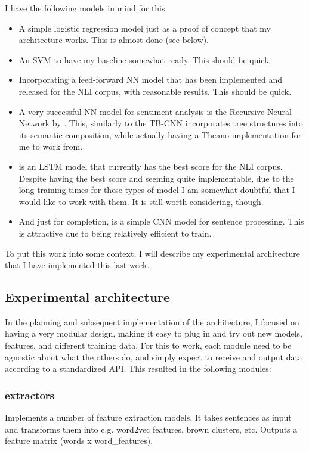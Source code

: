 I have the following models in mind for this:

\begin{itemize}
	\item A simple logistic regression model just as a proof of concept that my architecture works. This is almost done (see below).
	\item An SVM to have my baseline somewhat ready. This should be quick.
	\item Incorporating a feed-forward NN model that has been implemented and released for the NLI corpus, with reasonable results. This should be quick.
	\item A very successful NN model for sentiment analysis is the Recursive Neural Network by \cite{socher2013recursive}. This, similarly to the TB-CNN incorporates tree structures into its semantic composition, while actually having a Theano implementation for me to work from.
	\item \cite{cheng_long_2016} is an LSTM model that currently has the best score for the NLI corpus. Despite having the best score and seeming quite implementable, due to the long training times for these types of model I am somewhat doubtful that I would like to work with them. It is still worth considering, though.
	\item And just for completion, \cite{kim_convolutional_2014} is a simple CNN model for sentence processing. This is attractive due to being relatively efficient to train.
\end{itemize}

To put this work into some context, I will describe my experimental architecture that I have implemented this last week.

\subsection{Experimental architecture}

In the planning and subsequent implementation of the architecture, I focused on having a very modular design, making it easy to plug in and try out new models, features, and different training data. For this to work, each module need to be agnostic about what the others do, and simply expect to receive and output data according to a standardized API. This resulted in the following modules:

\subsubsection{extractors} Implements a number of feature extraction models. It takes sentences as input and transforms them into e.g. word2vec features, brown clusters, etc. Outputs a feature matrix (words x word\_features).

